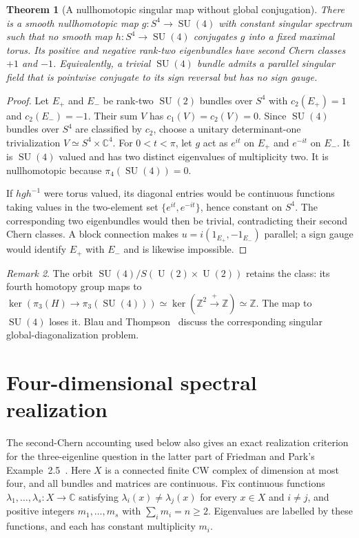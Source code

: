 \documentclass[11pt]{amsart}
\newcommand{\SU}{\operatorname{SU}}
\newcommand{\U}{\operatorname{U}}
\newcommand{\Z}{\mathbb Z}
\newcommand{\C}{\mathbb C}
\theoremstyle{plain}
\newtheorem{theorem}{Theorem}[section]
\theoremstyle{definition}
\theoremstyle{remark}
\newtheorem{remark}[theorem]{Remark}
\begin{document}
\begin{theorem}[A nullhomotopic singular map without global conjugation]\label{thm:s4}
There is a smooth nullhomotopic map $g:S^4\to\SU(4)$ with constant singular spectrum such that no smooth map $h:S^4\to\SU(4)$ conjugates $g$ into a fixed maximal torus. Its positive and negative rank-two eigenbundles have second Chern classes $+1$ and $-1$. Equivalently, a trivial $\SU(4)$ bundle admits a parallel singular field that is pointwise conjugate to its sign reversal but has no sign gauge.
\end{theorem}

\begin{proof}
Let $E_+$ and $E_-$ be rank-two $\SU(2)$ bundles over $S^4$ with $c_2(E_+)=1$ and $c_2(E_-)=-1$. Their sum $V$ has $c_1(V)=c_2(V)=0$. Since $\SU(4)$ bundles over $S^4$ are classified by $c_2$, choose a unitary determinant-one trivialization $V\simeq S^4\times\C^4$. For $0<t<\pi$, let $g$ act as $e^{it}$ on $E_+$ and $e^{-it}$ on $E_-$. It is $\SU(4)$ valued and has two distinct eigenvalues of multiplicity two. It is nullhomotopic because $\pi_4(\SU(4))=0$.

If $hgh^{-1}$ were torus valued, its diagonal entries would be continuous functions taking values in the two-element set $\{e^{it},e^{-it}\}$, hence constant on $S^4$. The corresponding two eigenbundles would then be trivial, contradicting their second Chern classes. A block connection makes $u=i(1_{E_+},-1_{E_-})$ parallel; a sign gauge would identify $E_+$ with $E_-$ and is likewise impossible.
\end{proof}

\begin{remark}
The orbit $\SU(4)/S(\U(2)\times\U(2))$ retains the class: its fourth homotopy group maps to $\ker(\pi_3(H)\to\pi_3(\SU(4)))\simeq\ker(\Z^2\xrightarrow{+}\Z)\simeq\Z$. The map to $\SU(4)$ loses it. Blau and Thompson~\cite[Section~6]{BlauThompson} discuss the corresponding singular global-diagonalization problem.
\end{remark}

\section{Four-dimensional spectral realization}

The second-Chern accounting used below also gives an exact realization
criterion for the three-eigenline question in the latter part of
Friedman and Park's Example~2.5~\cite{FriedmanPark2024}.
Here $X$ is a connected finite CW complex of dimension at most four,
and all bundles and matrices are continuous. Fix continuous functions
$\lambda_1,\ldots,\lambda_s:X\to\C$ satisfying
$\lambda_i(x)\ne\lambda_j(x)$ for every $x\in X$ and $i\ne j$,
and positive integers
$m_1,\ldots,m_s$ with $\sum_i m_i=n\geq2$. Eigenvalues are labelled by
these functions, and each has constant multiplicity $m_i$.
\end{document}
